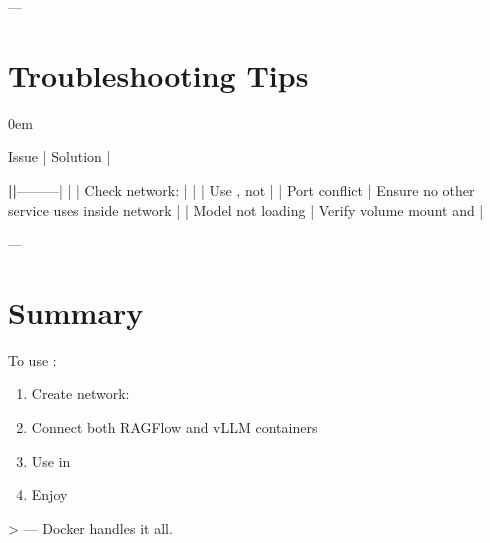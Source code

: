 \documentclass[letterpaper,10pt,english]{sphinxmanual}
\begin{document}
\sphinxAtStartPar
—


\section{Troubleshooting Tips}
\label{\detokenize{vllm-network:troubleshooting-tips}}
\begin{DUlineblock}{0em}
\item[] Issue | Solution |
\end{DUlineblock}

\sphinxAtStartPar
{\color{red}\bfseries{}|\sphinxhyphen{}\sphinxhyphen{}\sphinxhyphen{}\sphinxhyphen{}\sphinxhyphen{}\sphinxhyphen{}|}———\sphinxhyphen{}|
|  | Check network:  |
|  | Use , not  |
| Port conflict | Ensure no other service uses  inside network |
| Model not loading | Verify volume mount and  |

\sphinxAtStartPar
—


\section{Summary}
\label{\detokenize{vllm-network:summary}}
\sphinxAtStartPar
To use :
\begin{enumerate}
%
\item {} 
\sphinxAtStartPar
Create network: 

\item {} 
\sphinxAtStartPar
Connect both RAGFlow and vLLM containers

\item {} 
\sphinxAtStartPar
Use  in 

\item {} 
\sphinxAtStartPar
Enjoy 

\end{enumerate}

\sphinxAtStartPar
\textgreater{}  — Docker handles it all.
\end{document}
